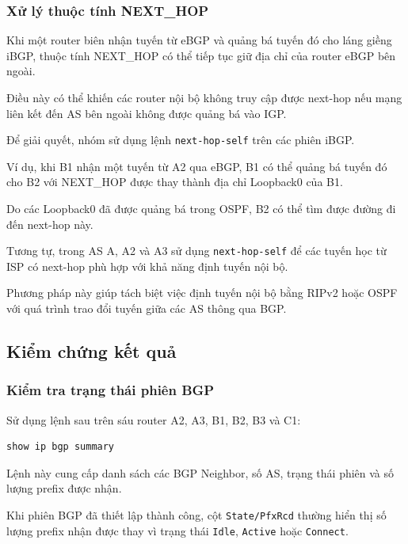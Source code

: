 
\subsubsection{Xử lý thuộc tính NEXT\_HOP}

Khi một router biên nhận tuyến
từ eBGP và quảng bá tuyến đó
cho láng giềng iBGP, thuộc tính
NEXT\_HOP có thể tiếp tục giữ
địa chỉ của router eBGP bên ngoài.

Điều này có thể khiến các router
nội bộ không truy cập được next-hop
nếu mạng liên kết đến AS bên ngoài
không được quảng bá vào IGP.

Để giải quyết, nhóm sử dụng
lệnh \texttt{next-hop-self}
trên các phiên iBGP.

Ví dụ, khi B1 nhận một tuyến
từ A2 qua eBGP, B1 có thể
quảng bá tuyến đó cho B2
với NEXT\_HOP được thay thành
địa chỉ Loopback0 của B1.

Do các Loopback0 đã được quảng bá
trong OSPF, B2 có thể tìm được
đường đi đến next-hop này.

Tương tự, trong AS A,
A2 và A3 sử dụng
\texttt{next-hop-self}
để các tuyến học từ ISP
có next-hop phù hợp với
khả năng định tuyến nội bộ.

Phương pháp này giúp tách biệt
việc định tuyến nội bộ bằng
RIPv2 hoặc OSPF với quá trình
trao đổi tuyến giữa các AS
thông qua BGP.



\subsection{Kiểm chứng kết quả}

\subsubsection{Kiểm tra trạng thái phiên BGP}

Sử dụng lệnh sau trên sáu router
A2, A3, B1, B2, B3 và C1:

\begin{lstlisting}
show ip bgp summary
\end{lstlisting}

Lệnh này cung cấp danh sách
các BGP Neighbor, số AS,
trạng thái phiên và số lượng
prefix được nhận.

Khi phiên BGP đã thiết lập thành công,
cột \texttt{State/PfxRcd} thường
hiển thị số lượng prefix nhận được
thay vì trạng thái
\texttt{Idle}, \texttt{Active}
hoặc \texttt{Connect}.

